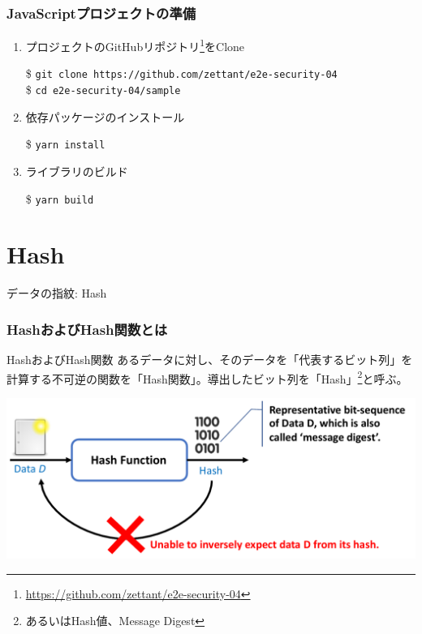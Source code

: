 \documentclass[12pt,dvipdfmx]{beamer}
\begin{document}
\begin{frame}
\frametitle{JavaScriptプロジェクトの準備}
\begin{enumerate}
\item プロジェクトのGitHubリポジトリ\footnote[frame]{\url{https://github.com/zettant/e2e-security-04}}をClone\\
\begin{exampleblock}{}
\footnotesize
\$ \texttt{git clone https://github.com/zettant/e2e-security-04}\\
\$ \texttt{cd e2e-security-04/sample}
\end{exampleblock}
\item 依存パッケージのインストール
\begin{exampleblock}{}
\$ \texttt{yarn install}
\end{exampleblock}
\item ライブラリのビルド
\begin{exampleblock}{}
\$ \texttt{yarn build}
\end{exampleblock}
\end{enumerate}
\end{frame}


\section{Hash}
\begin{frame}
\centering
{\Large データの指紋: Hash}
\end{frame}

\begin{frame}
\frametitle{HashおよびHash関数とは}
\begin{block}{\small HashおよびHash関数}
あるデータに対し、そのデータを「代表するビット列」を計算する不可逆の関数を「Hash関数」。導出したビット列を「Hash」\footnote[frame]{あるいはHash値、Message Digest}と呼ぶ。
\end{block}
\begin{center}
\includegraphics[width=0.8\linewidth]{Figs/hash-flow01.pdf}
\end{center}
\end{frame}
\end{document}
